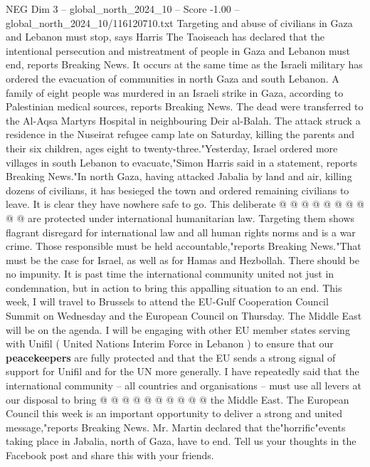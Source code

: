 \begin{textsample}{NEG Dim 3 – global\_north\_2024\_10 – Score -1.00 – global\_north\_2024\_10/116120710.txt}  \label{ex:f3_neg_302}
Targeting and abuse of civilians in Gaza and Lebanon must stop, says Harris The Taoiseach has declared that the intentional persecution and mistreatment of people in Gaza and Lebanon must end, reports Breaking News.
It occurs at the same time as the Israeli military has ordered the evacuation of communities in north Gaza and south Lebanon.
A family of eight people was murdered in an Israeli strike in Gaza, according to Palestinian medical sources, reports Breaking News.
The dead were transferred to the Al-Aqsa Martyrs Hospital in neighbouring Deir al-Balah.
The attack struck a residence in the Nuseirat refugee camp late on Saturday, killing the parents and their six children, ages eight to twenty-three."Yesterday, Israel ordered more villages in south Lebanon to evacuate,"Simon Harris said in a statement, reports Breaking News."In north Gaza, having attacked Jabalia by land and air, killing dozens of civilians, it has besieged the town and ordered remaining civilians to leave.
It is clear they have nowhere safe to go.
This deliberate @ @ @ @ @ @ @ @ @ @ are protected under international humanitarian law.
Targeting them shows flagrant disregard for international law and all human rights norms and is a war crime.
Those responsible must be held accountable,"reports Breaking News."That must be the case for Israel, as well as for Hamas and Hezbollah.
There should be no impunity.
It is past time the international community united not just in condemnation, but in action to bring this appalling situation to an end.
This week, I will travel to Brussels to attend the EU-Gulf Cooperation Council Summit on Wednesday and the European Council on Thursday.
The Middle East will be on the agenda.
I will be engaging with other EU member states serving with Unifil ( United Nations Interim Force in Lebanon ) to ensure that our \textbf{peacekeepers} are fully protected and that the EU sends a strong signal of support for Unifil and for the UN more generally.
I have repeatedly said that the international community -- all countries and organisations -- must use all levers at our disposal to bring @ @ @ @ @ @ @ @ @ @ the Middle East.
The European Council this week is an important opportunity to deliver a strong and united message,"reports Breaking News.
Mr.
Martin declared that the"horrific"events taking place in Jabalia, north of Gaza, have to end.
Tell us your thoughts in the Facebook post and share this with your friends.

\end{textsample}
